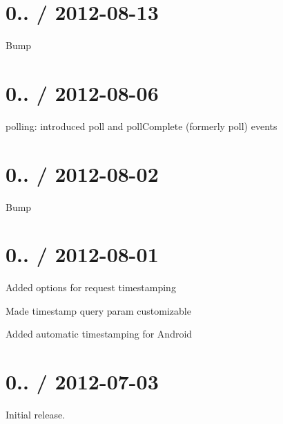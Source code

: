 \section*{0.. / 2012-\/08-\/13 }


\begin{DoxyItemize}
\item Bump
\end{DoxyItemize}

\section*{0.. / 2012-\/08-\/06 }


\begin{DoxyItemize}
\item polling\+: introduced {\ttfamily poll} and {\ttfamily poll\+Complete} (formerly {\ttfamily poll}) events
\end{DoxyItemize}

\section*{0.. / 2012-\/08-\/02 }


\begin{DoxyItemize}
\item Bump
\end{DoxyItemize}

\section*{0.. / 2012-\/08-\/01 }


\begin{DoxyItemize}
\item Added options for request timestamping
\item Made timestamp query param customizable
\item Added automatic timestamping for Android
\end{DoxyItemize}

\section*{0.. / 2012-\/07-\/03 }


\begin{DoxyItemize}
\item Initial release. 
\end{DoxyItemize}